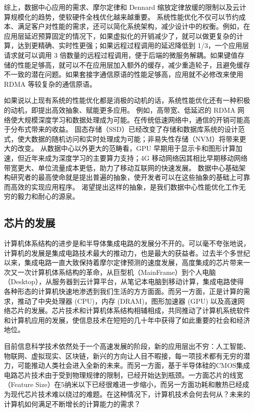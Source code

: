 综上，数据中心应用的需求、摩尔定律和 Dennard 缩放定律放缓的限制以及云计算规模化的趋势，使软硬件全栈优化越来越重要。
系统性能优化不仅可以节约成本、满足客户对性能的需求，还可以简化系统架构，减少设计中的权衡。例如，在应用层延迟预算固定的情况下，如果虚拟化的开销减少了，就可以做更复杂的计算，达到更精确、实时性更强；如果远程过程调用的延迟降低到 1/3，一个应用层请求就可以调用 3 倍数量的远程过程调用，便于后端的微服务解耦。如果键值存储的性能足够高，就可以不在应用层加入额外的缓存，减少重造轮子，且避免缓存不一致的潜在问题。如果套接字通信原语的性能足够高，应用就不必修改来使用 RDMA 等较复杂的通信原语。

如果说以上现有系统的性能优化都是消极的动机的话，系统性能优化还有一种积极的动机，即提出高效抽象、赋能更多应用。
例如，高带宽、低延迟的 RDMA 网络使大规模深度学习和数据处理成为可能。在传统低速网络中，通信的开销可能高于分布式带来的收益。
固态存储（SSD）已经改变了存储和数据库系统的设计范式，使大数据的随机访问和实时处理成为可能；非易失性存储（NVM）将带来更大的改变。
从数据中心以外更大的范畴看，GPU 早期用于显示卡和图形计算加速，但近年来成为深度学习的主要算力支持；4G 移动网络因其相比早期移动网络带宽更大、单位流量成本更低，助力了移动互联网的快速发展。
数据中心基础架构研究者的最高使命就是提出普遍的抽象，使开发者可以在这些抽象的基础上可靠而高效的实现应用程序。
渴望提出这样的抽象，是我们数据中心性能优化工作无穷的毅力和耐心的源泉。


\iffalse

\subsection{芯片的发展}

计算机体系结构的进步是和半导体集成电路的发展分不开的。可以毫不夸张地说，计算机的发展是集成电路技术最大的推动力，也是最大的获益者。过去半个多世纪以来，集成电路一直大致保持着摩尔定律预测的速度发展，高度集成的芯片带来一次又一次计算机体系结构的革命，从巨型机（MainFrame）到个人电脑（Desktop），从服务器到云计算平台，从笔记本电脑到移动计算，集成电路使得各种形态的计算机快速地渗透到我们生活的方方面面。而另一方面，正是计算的需求，推动了中央处理器 (CPU)，内存 (DRAM)，图形加速器 (GPU) 以及高速网络芯片的发展。芯片技术和计算机体系结构相辅相成，共同推动了计算机系统软件和计算机应用的发展，使信息技术在短短的几十年中获得了如此重要的社会和经济地位。

目前信息科学技术依然处于一个高速发展的阶段，新的应用层出不穷：人工智能、物联网、虚拟现实、区块链，新兴的方向让人目不暇接，每一项技术都有无穷的潜力，可能推动人类社会进入全新的未来。而另一方面，基于半导体硅的CMOS集成电路芯片技术由于受到物理规律的限制，已经开始达到瓶颈。一方面芯片的线宽（Feature Size）在5纳米以下已经很难进一步缩小，而另一方面功耗和散热已经成为现代芯片技术难以绕过的难题。在这种情况下，计算机技术会何去何从？未来的计算机如何满足不断增长的计算能力的需求？

